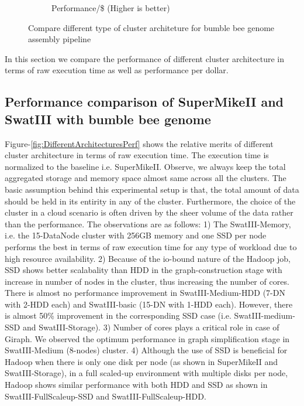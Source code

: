 \documentclass[conference]{IEEEtran}
\begin{document}
\begin{figure}[htb]
\begin{subfigure}[b]{0.5\textwidth}
                \caption{Performance/\$ (Higher is better)}
                \label{fig:DifferentArchitecturesPerfPerDollar}
        \end{subfigure}
        \caption{Compare different type of cluster architeture for bumble bee genome assembly pipeline}
  \label{fig:DifferentArchitectures}
\end{figure}
In this section we compare the performance of different cluster architecture in terms of raw execution time as well as performance per dollar.
\subsection {Performance comparison of SuperMikeII and SwatIII with bumble bee genome}
Figure-\ref{fig:DifferentArchitecturesPerf} shows the relative merits of different cluster architecture in terms of raw execution time. The execution time is normalized to the baseline i.e. SuperMikeII.
Observe, we always keep the total aggregated storage and memory space almost same across all the clusters.
The basic assumption behind this experimental setup is that, the total amount of data should be held in its entirity in any of the cluster. 
Furthermore, the choice of the cluster in a cloud scenario is often driven by the sheer volume of the data rather than the performance.
The observations are as follows:
1) The SwatIII-Memory, i.e. the 15-DataNode cluster with 256GB memory and one SSD per node performs the best in terms of raw execution time for any type of workload due to high resource availability.
2) Because of the io-bound nature of the Hadoop job, SSD shows better scalabality than HDD in the graph-construction stage with increase in number of nodes in the cluster, thus increasing the number of cores. There is almost no performance improvement in SwatIII-Medium-HDD (7-DN with 2-HDD each) and SwatIII-basic (15-DN with 1-HDD each). However, there is almost 50\% improvement in the corresponding SSD case (i.e. SwatIII-medium-SSD and SwatIII-Storage).
3) Number of cores plays a critical role in case of Giraph. We observed the optimum performance in graph simplification stage in SwatIII-Medium (8-nodes) cluster.
4) Although the use of SSD is beneficial for Hadoop when there is only one disk per node (as shown in SuperMikeII and SwatIII-Storage), in a full scaled-up environment with multiple disks per node, Hadoop shows similar performance with both HDD and SSD as shown in SwatIII-FullScaleup-SSD and SwatIII-FullScaleup-HDD.
\end{document}
